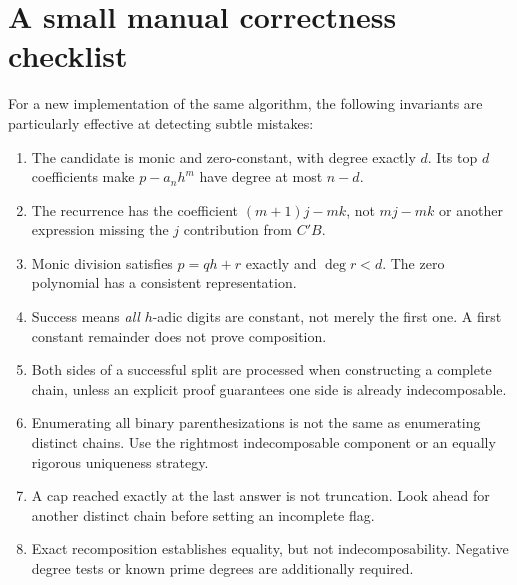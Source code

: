 \documentclass[11pt,letterpaper]{article}
\theoremstyle{definition}
\theoremstyle{remark}
\begin{document}
\section{A small manual correctness checklist}
For a new implementation of the same algorithm, the following invariants
are particularly effective at detecting subtle mistakes:
\begin{enumerate}
\item The candidate is monic and zero-constant, with degree exactly $d$.
Its top $d$ coefficients make $p-a_nh^m$ have degree at most $n-d$.
\item The recurrence has the coefficient $(m+1)j-mk$, not $mj-mk$
or another expression missing the $j$ contribution from $C'B$.
\item Monic division satisfies $p=qh+r$ exactly and $\deg r<d$.
The zero polynomial has a consistent representation.
\item Success means \emph{all} $h$-adic digits are constant, not merely
the first one. A first constant remainder does not prove composition.
\item Both sides of a successful split are processed when constructing
a complete chain, unless an explicit proof guarantees one side is
already indecomposable.
\item Enumerating all binary parenthesizations is not the same as
enumerating distinct chains. Use the rightmost indecomposable component
or an equally rigorous uniqueness strategy.
\item A cap reached exactly at the last answer is not truncation.
Look ahead for another distinct chain before setting an incomplete flag.
\item Exact recomposition establishes equality, but not indecomposability.
Negative degree tests or known prime degrees are additionally required.
\end{enumerate}
\end{document}
